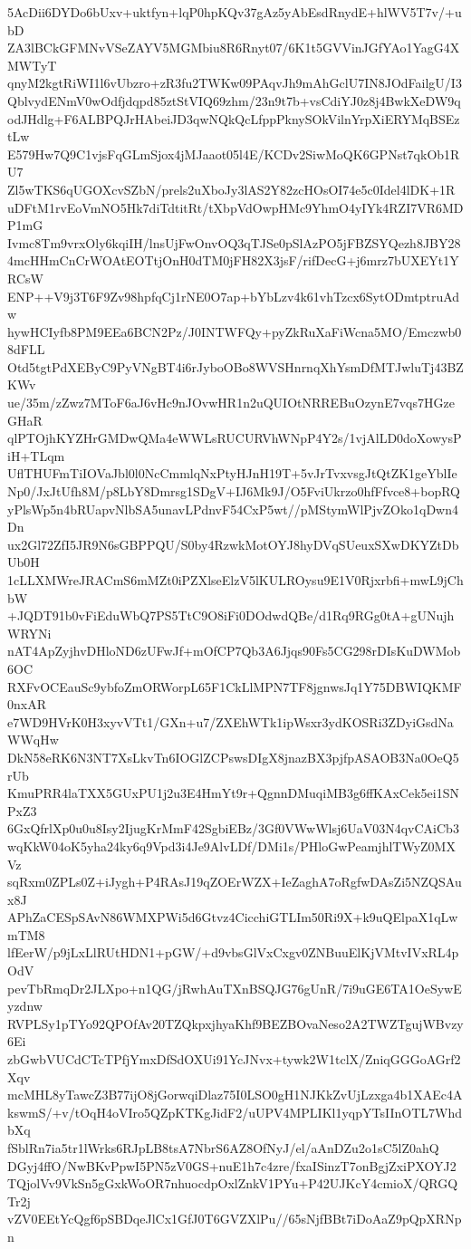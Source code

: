 5AcDii6DYDo6bUxv+uktfyn+lqP0hpKQv37gAz5yAbEsdRnydE+hlWV5T7v/+ubD
ZA3lBCkGFMNvVSeZAYV5MGMbiu8R6Rnyt07/6K1t5GVVinJGfYAo1YagG4XMWTyT
qnyM2kgtRiWI1l6vUbzro+zR3fu2TWKw09PAqvJh9mAhGclU7IN8JOdFailgU/I3
QblvydENmV0wOdfjdqpd85ztStVIQ69zhm/23n9t7b+vsCdiYJ0z8j4BwkXeDW9q
odJHdlg+F6ALBPQJrHAbeiJD3qwNQkQcLfppPknySOkVilnYrpXiERYMqBSEztLw
E579Hw7Q9C1vjsFqGLmSjox4jMJaaot05l4E/KCDv2SiwMoQK6GPNst7qkOb1RU7
Zl5wTKS6qUGOXcvSZbN/prels2uXboJy3lAS2Y82zcHOsOI74e5c0Idel4lDK+1R
uDFtM1rvEoVmNO5Hk7diTdtitRt/tXbpVdOwpHMc9YhmO4yIYk4RZI7VR6MDP1mG
Ivmc8Tm9vrxOly6kqiIH/lnsUjFwOnvOQ3qTJSe0pSlAzPO5jFBZSYQezh8JBY28
4mcHHmCnCrWOAtEOTtjOnH0dTM0jFH82X3jsF/rifDecG+j6mrz7bUXEYt1YRCsW
ENP++V9j3T6F9Zv98hpfqCj1rNE0O7ap+bYbLzv4k61vhTzcx6SytODmtptruAdw
hywHCIyfb8PM9EEa6BCN2Pz/J0INTWFQy+pyZkRuXaFiWcna5MO/Emczwb08dFLL
Otd5tgtPdXEByC9PyVNgBT4i6rJyboOBo8WVSHnrnqXhYsmDfMTJwluTj43BZKWv
ue/35m/zZwz7MToF6aJ6vHc9nJOvwHR1n2uQUIOtNRREBuOzynE7vqs7HGzeGHaR
qlPTOjhKYZHrGMDwQMa4eWWLsRUCURVhWNpP4Y2s/1vjAlLD0doXowysPiH+TLqm
UflTHUFmTiIOVaJbl0l0NcCmmlqNxPtyHJnH19T+5vJrTvxvsgJtQtZK1geYblIe
Np0/JxJtUfh8M/p8LbY8Dmrsg1SDgV+IJ6Mk9J/O5FviUkrzo0hfFfvce8+bopRQ
yPlsWp5n4bRUapvNlbSA5unavLPdnvF54CxP5wt//pMStymWlPjvZOko1qDwn4Dn
ux2Gl72ZfI5JR9N6sGBPPQU/S0by4RzwkMotOYJ8hyDVqSUeuxSXwDKYZtDbUb0H
1cLLXMWreJRACmS6mMZt0iPZXlseElzV5lKULROysu9E1V0Rjxrbfi+mwL9jChbW
+JQDT91b0vFiEduWbQ7PS5TtC9O8iFi0DOdwdQBe/d1Rq9RGg0tA+gUNujhWRYNi
nAT4ApZyjhvDHloND6zUFwJf+mOfCP7Qb3A6Jjqs90Fs5CG298rDIsKuDWMob6OC
RXFvOCEauSc9ybfoZmORWorpL65F1CkLlMPN7TF8jgnwsJq1Y75DBWIQKMF0nxAR
e7WD9HVrK0H3xyvVTt1/GXn+u7/ZXEhWTk1ipWsxr3ydKOSRi3ZDyiGsdNaWWqHw
DkN58eRK6N3NT7XsLkvTn6IOGlZCPswsDIgX8jnazBX3pjfpASAOB3Na0OeQ5rUb
KmuPRR4laTXX5GUxPU1j2u3E4HmYt9r+QgnnDMuqiMB3g6ffKAxCek5ei1SNPxZ3
6GxQfrlXp0u0u8Isy2IjugKrMmF42SgbiEBz/3Gf0VWwWlsj6UaV03N4qvCAiCb3
wqKkW04oK5yha24ky6q9Vpd3i4Je9AlvLDf/DMi1s/PHloGwPeamjhlTWyZ0MXVz
sqRxm0ZPLs0Z+iJygh+P4RAsJ19qZOErWZX+IeZaghA7oRgfwDAsZi5NZQSAux8J
APhZaCESpSAvN86WMXPWi5d6Gtvz4CicchiGTLIm50Ri9X+k9uQElpaX1qLwmTM8
lfEerW/p9jLxLlRUtHDN1+pGW/+d9vbsGlVxCxgv0ZNBuuElKjVMtvIVxRL4pOdV
pevTbRmqDr2JLXpo+n1QG/jRwhAuTXnBSQJG76gUnR/7i9uGE6TA1OeSywEyzdnw
RVPLSy1pTYo92QPOfAv20TZQkpxjhyaKhf9BEZBOvaNeso2A2TWZTgujWBvzy6Ei
zbGwbVUCdCTcTPfjYmxDfSdOXUi91YcJNvx+tywk2W1tclX/ZniqGGGoAGrf2Xqv
mcMHL8yTawcZ3B77ijO8jGorwqiDlaz75I0LSO0gH1NJKkZvUjLzxga4b1XAEc4A
kswmS/+v/tOqH4oVIro5QZpKTKgJidF2/uUPV4MPLIKl1yqpYTsIInOTL7WhdbXq
fSblRn7ia5tr1lWrks6RJpLB8tsA7NbrS6AZ8OfNyJ/el/aAnDZu2o1sC5lZ0ahQ
DGyj4ffO/NwBKvPpwI5PN5zV0GS+nuE1h7c4zre/fxaISinzT7onBgjZxiPXOYJ2
TQjolVv9VkSn5gGxkWoOR7nhuocdpOxlZnkV1PYu+P42UJKcY4cmioX/QRGQTr2j
vZV0EEtYcQgf6pSBDqeJlCx1GfJ0T6GVZXlPu//65sNjfBBt7iDoAaZ9pQpXRNpn

